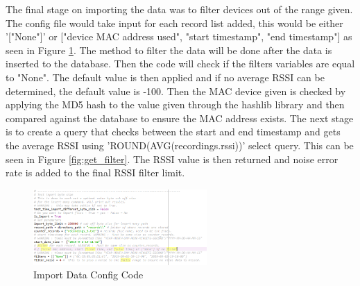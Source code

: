 \documentclass{report}
\begin{document}
The final stage on importing the data was to filter devices out of the range given. The config file would take input for each record list added, this would be either '["None"]' or ["device MAC address used", "start timestamp", "end timestamp"] as seen in Figure \ref{fig:import_data_config}. The method to filter the data will be done after the data is inserted to the database. Then the code will check if the filters variables are equal to "None". The default value is then applied and if no average RSSI can be determined, the default value is -100. Then the MAC device given is checked by applying the MD5 hash to the value given through the hashlib library\cite{hashlib} and then compared against the database to ensure the MAC address exists. The next stage is to create a query that checks between the start and end timestamp and gets the average RSSI using 'ROUND(AVG(recordings.rssi))' select query. This can be seen in Figure \ref{fig:get_filter}. The RSSI value is then returned and noise error rate is added to the final RSSI filter limit. \\ \newline
\clearpage
\begin{figure}[h!]
    \centering
    \includegraphics[width=250]{config_import.PNG}
    \caption{Import Data Config Code}
    \label{fig:import_data_config}
\end{figure} \\
\end{document}
